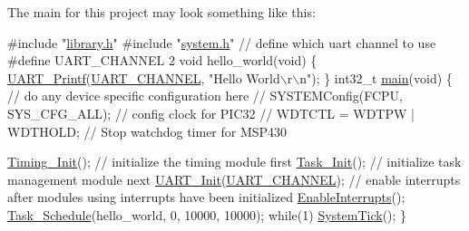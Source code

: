The main for this project may look something like this\+: 
\begin{DoxyCode}
\textcolor{preprocessor}{#include "\hyperlink{library_8h}{library.h}"}
\textcolor{preprocessor}{#include "\hyperlink{system_8h}{system.h}"}
\textcolor{comment}{// define which uart channel to use}
\textcolor{preprocessor}{#define UART\_CHANNEL 2}
\textcolor{keywordtype}{void} hello\_world(\textcolor{keywordtype}{void}) \{
    \hyperlink{uart_8c_a938ff162e09b003006152435a33ba5f5}{UART\_Printf}(\hyperlink{main_8c_a83c524f684970472a9ae3ba181fdec80}{UART\_CHANNEL}, \textcolor{stringliteral}{"Hello World\(\backslash\)r\(\backslash\)n"});
\}
int32\_t \hyperlink{main_8c_a52d2cba30e6946c95578be946ac12a65}{main}(\textcolor{keywordtype}{void})
\{
    \textcolor{comment}{// do any device specific configuration here}
    \textcolor{comment}{// SYSTEMConfig(FCPU, SYS\_CFG\_ALL); // config clock for PIC32}
    \textcolor{comment}{// WDTCTL = WDTPW | WDTHOLD;    // Stop watchdog timer for MSP430}

    \hyperlink{group__timing_ga6a7bd5705bafa4dd205b38a13e50263c}{Timing\_Init}(); \textcolor{comment}{// initialize the timing module first}
    \hyperlink{group__task_gaa6ab5350efe602f7bdfdca42aa57aff2}{Task\_Init}(); \textcolor{comment}{// initialize task management module next}
    \hyperlink{uart_8c_ace506ef2867a6ee30406b132eb624ed8}{UART\_Init}(\hyperlink{main_8c_a83c524f684970472a9ae3ba181fdec80}{UART\_CHANNEL});
    \textcolor{comment}{// enable interrupts after modules using interrupts have been initialized}
    \hyperlink{hal__general_8h_ab1eea217dc48da9434887d1b9eca9067}{EnableInterrupts}();
    \hyperlink{group__task_gadbe36e55ccb027326512672c71bf7ff3}{Task\_Schedule}(hello\_world, 0, 10000, 10000);
    \textcolor{keywordflow}{while}(1) \hyperlink{group__task_gafd2aa563748d1ede229e5867753ead5d}{SystemTick}();
\}
\end{DoxyCode}
 